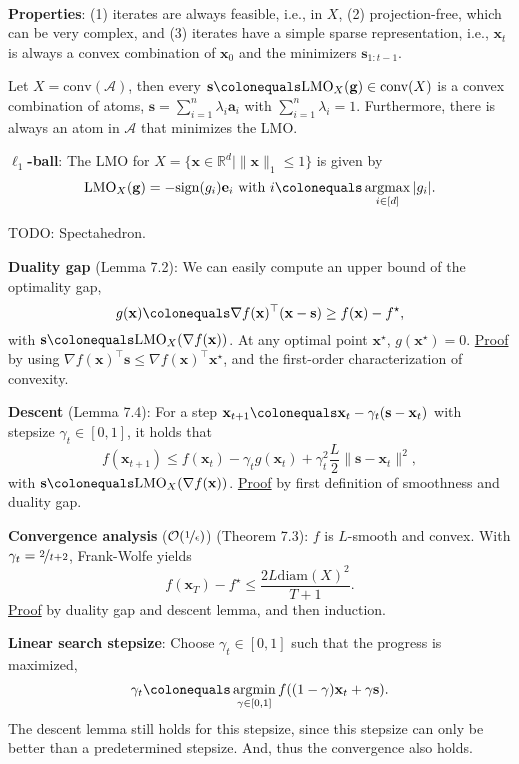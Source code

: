 \documentclass{article}
\DeclareMathOperator*{\argmax}{argmax}
\DeclareMathOperator*{\argmin}{argmin}
\newcommand{\R}{\mathbb{R}}
\renewcommand{\vec}[1]{\mathbf{#1}}
\newcommand{\transpose}[1]{#1^\top}
\newenvironment{topic}[1]
{\textbf{\sffamily \colorbox{black}{\rlap{\textbf{\textcolor{white}{#1}}}\hspace{\linewidth}\hspace{-2\fboxsep}}} \\ \vspace{0.2cm}}
{}
\begin{document}
\begin{multicols*}{2}
\begin{topic}{7 The Frank-Wolfe algorithm}
        \textbf{Properties}: (1) iterates are always feasible, i.e., in $X$, (2) projection-free, which can be
        very complex, and (3) iterates have a simple sparse representation, i.e., $\vec{x}_t$ is
        always a convex combination of $\vec{x}_0$ and the minimizers $\vec{s}_{1:t-1}$.

        Let $X = \mathrm{conv}(\mathcal{A})$, then every $\vec{s} \colonequals \mathrm{LMO}_X(\vec{g}) \in
            \mathrm{conv}(X)$ is a convex combination of atoms, $\vec{s} = \sum_{i=1}^{n} \lambda_i \vec{a}_i$
        with $\sum_{i=1}^{n} \lambda_i = 1$. Furthermore, there is always an atom in $\mathcal{A}$ that
        minimizes the LMO.

        \textbf{$\ell_1$-ball}: The LMO for $X = \{ \vec{x} \in \R^d \mid \| \vec{x} \|_1 \leq 1 \}$ is given by \[
            \mathrm{LMO}_X(\vec{g}) = -\mathrm{sign}(g_i) \vec{e}_i \text{ with } i \colonequals \argmax_{i \in [d]} | g_i |.
        \]

        TODO: Spectahedron.

        \textbf{Duality gap} (Lemma 7.2): We can easily compute an upper bound of the optimality gap, \[
            g(\vec{x}) \colonequals \transpose{\nabla f(\vec{x})} (\vec{x} - \vec{s}) \geq f(\vec{x}) - f^\star,
        \]
        with $\vec{s} \colonequals \mathrm{LMO}_X(\nabla f(\vec{x}))$. At any optimal point
        $\vec{x}^\star$, $g(\vec{x}^\star) = 0$. \underline{Proof} by using $\transpose{\nabla f(\vec{x})}
            \vec{s} \leq \transpose{\nabla f(\vec{x})} \vec{x}^\star$, and the first-order characterization of
        convexity.

        \textbf{Descent} (Lemma 7.4): For a step $\vec{x}_{t+1} \colonequals \vec{x}_t - \gamma_t (\vec{s} - \vec{x}_t)$ with stepsize $\gamma_t \in [0,1]$, it holds that \[
            f(\vec{x}_{t+1}) \leq f(\vec{x}_t) - \gamma_t g(\vec{x}_t) + \gamma_t^2 \frac{L}{2} \| \vec{s} - \vec{x}_t \|^2,
        \]
        with $\vec{s} \colonequals \mathrm{LMO}_X(\nabla f(\vec{x}))$. \underline{Proof} by first
        definition of smoothness and duality gap.

        \textbf{Convergence analysis} ($\mathcal{O}(\nicefrac{1}{\epsilon})$) (Theorem 7.3): $f$ is $L$-smooth and convex. With $\gamma_t = \nicefrac{2}{t+2}$, Frank-Wolfe yields \[
            f(\vec{x}_T) - f^\star \leq \frac{2L \mathrm{diam}(X)^2}{T+1}.
        \]
        \underline{Proof} by duality gap and descent lemma, and then induction.

        \textbf{Linear search stepsize}: Choose $\gamma_t \in [0,1]$ such that the progress is maximized, \[
            \gamma_t \colonequals \argmin_{\gamma \in [0,1]} f((1-\gamma) \vec{x}_t + \gamma \vec{s}).
        \]
        The descent lemma still holds for this stepsize, since this stepsize can only be better than a
        predetermined stepsize. And, thus the convergence also holds.


\end{topic}
\end{multicols*}
\end{document}
